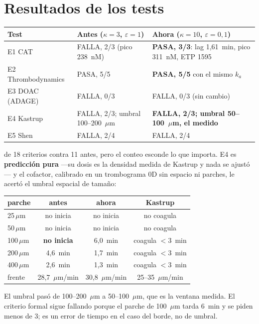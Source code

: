 \documentclass[11pt,a4paper]{article}
\begin{document}
\section{Resultados de los tests}

\begin{center}
\small
\begin{tabular}{@{}lp{4.5cm}p{6.4cm}@{}}
\toprule
Test & Antes ($\kappa=3$, $\varepsilon=1$) & Ahora ($\kappa=10$, $\varepsilon=0{,}1$) \\
\midrule
E1 CAT & FALLA, 2/3 (pico 238~nM) & \textbf{PASA, 3/3}: lag 1{,}61~min, pico 311~nM, ETP 1595 \\
E2 Thrombodynamics & PASA, 5/5 & \textbf{PASA, 5/5} con el mismo $k_a$ \\
E3 DOAC (ADAGE) & FALLA, 0/3 & FALLA, 0/3 (sin cambio) \\
E4 Kastrup & FALLA, 2/3; umbral 100--200~$\mu$m & \textbf{FALLA, 2/3; umbral 50--100~$\mu$m, el medido} \\
E5 Shen & FALLA, 2/4 & FALLA, 2/4 \\
\bottomrule
\end{tabular}
\end{center}

 de 18 criterios contra 11 antes, pero el conteo esconde lo que importa. E4 es
\textbf{predicción pura} ---su dosis es la densidad medida de Kastrup y nada se
ajustó--- y el cofactor, calibrado en un trombograma 0D sin espacio ni parches,
le acertó el umbral espacial de tamaño:

\begin{center}
\small
\begin{tabular}{@{}lccc@{}}
\toprule
parche & antes & ahora & Kastrup \\
\midrule
25\,$\mu$m & no inicia & no inicia & no coagula \\
50\,$\mu$m & no inicia & no inicia & no coagula \\
100\,$\mu$m & \textbf{no inicia} & 6{,}0~min & coagula $<3$~min \\
200\,$\mu$m & 4{,}6~min & 1{,}7~min & coagula $<3$~min \\
400\,$\mu$m & 2{,}6~min & 1{,}3~min & coagula $<3$~min \\
frente & 28{,}7~$\mu$m/min & 30{,}8~$\mu$m/min & 25--35~$\mu$m/min \\
\bottomrule
\end{tabular}
\end{center}

\noindent
El umbral pasó de 100--200~$\mu$m a 50--100~$\mu$m, que es la ventana medida.
El criterio formal sigue fallando porque el parche de 100~$\mu$m tarda 6~min y se
piden menos de 3; es un error de tiempo en el caso del borde, no de umbral.
\end{document}
